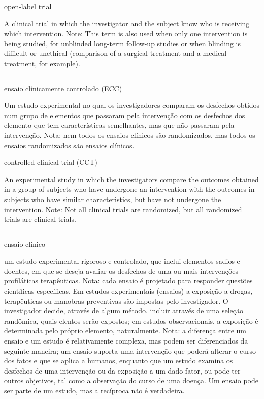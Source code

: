 \documentclass[
  openany]{book}
\begin{document}
open-label trial

A clinical trial in which the investigator and the subject know who is receiving which intervention. Note: This term is also used when only one intervention is being studied, for unblinded long-term follow-up studies or when blinding is difficult or unethical (comparison of a surgical treatment and a medical treatment, for example).

\begin{center}\rule{0.5\linewidth}{0.5pt}\end{center}

ensaio clínicamente controlado (ECC)

Um estudo experimental no qual os investigadores comparam os desfechos obtidos num grupo de elementos que passaram pela intervenção com os desfechos dos elemento que tem características semelhantes, mas que não passaram pela intervenção. Nota: nem todos os ensaios clínicos são randomizados, mas todos os ensaios randomizados são ensaios clínicos.

controlled clinical trial (CCT)

An experimental study in which the investigators compare the outcomes obtained in a group of subjects who have undergone an intervention with the outcomes in subjects who have similar characteristics, but have not undergone the intervention. Note: Not all clinical trials are randomized, but all randomized trials are clinical trials.

\begin{center}\rule{0.5\linewidth}{0.5pt}\end{center}

ensaio clínico

um estudo experimental rigoroso e controlado, que inclui elementos sadios e doentes, em que se deseja avaliar os desfechos de uma ou mais intervenções profiláticas terapêuticas. Nota: cada ensaio é projetado para responder questões científicas específicas. Em estudos experimentais (ensaios) a exposição a drogas, terapêuticas ou manobras preventivas são impostas pelo investigador. O investigador decide, através de algum método, incluir através de uma seleção randômica, quais elentos serão expostos; em estudos observacionais, a exposição é determinada pelo próprio elemento, naturalmente. Nota: a diferença entre um ensaio e um estudo é relativamente complexa, mas podem ser diferenciados da seguinte maneira; um ensaio suporta uma intervenção que poderá alterar o curso dos fatos e que se aplica a humanos, enquanto que um estudo examina os desfechos de uma intervenção ou da exposição a um dado fator, ou pode ter outros objetivos, tal como a observação do curso de uma doença. Um ensaio pode ser parte de um estudo, mas a recíproca não é verdadeira.
\end{document}
